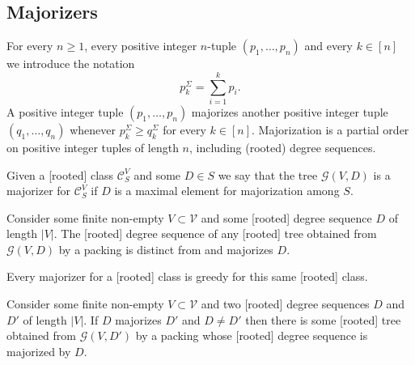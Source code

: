\documentclass[11 pt]{modarticle}
\newcommand{\vset}{\mathcal{V}}
\newcommand{\size}[1]{|#1|}
\newcommand{\tclass}{\mathcal{C}}
\newcommand{\greedy}[2]{\mathcal{G}(#1,#2)}
\newcommand{\pclass}[2]{\tclass^{#1}_{#2}}
\begin{document}
\subsection{Majorizers}\label{section:majorization}

For every $n \geq 1$, every positive integer $n$-tuple $(p_1, \dots, p_n)$ and every $k \in [n]$ we introduce the notation
\begin{equation*}
	p^{\Sigma}_k = \underset{i=1}{\overset{k}{\sum}} p_i.
\end{equation*}
A positive integer tuple $(p_1, \dots, p_n)$ majorizes another positive integer tuple $(q_1, \dots, q_n)$ whenever $p^{\Sigma}_k \geq q^{\Sigma}_k$ for every $k \in [n]$. Majorization is a partial order on positive integer tuples of length $n$, including (rooted) degree sequences.%


\begin{defi}
Given a [rooted] class $\pclass{V}{S}$ and some $D \in S$ we say that the tree $\greedy{V}{D}$ is a majorizer for $\pclass{V}{S}$ if $D$ is a maximal element for majorization among $S$.
\end{defi}

\begin{rem}\label{rem:majorization}
Consider some finite non-empty $V \subset \vset$ and some [rooted] degree sequence $D$ of length $\size{V}$. The [rooted] degree sequence of any [rooted] tree obtained from $\greedy{V}{D}$ by a packing is distinct from and majorizes $D$.
\end{rem}

\begin{cor}\label{cor:majorization}
Every majorizer for a [rooted] class is greedy for this same [rooted] class.
\end{cor}

\begin{prop}\label{prop:majorization}
Consider some finite non-empty $V \subset \vset$ and two [rooted] degree sequences $D$ and $D'$ of length $\size{V}$. If $D$ majorizes $D'$ and $D \neq D'$ then there is some [rooted] tree obtained from $\greedy{V}{D'}$ by a packing whose [rooted] degree sequence is majorized by $D$.
\end{prop}
\end{document}
